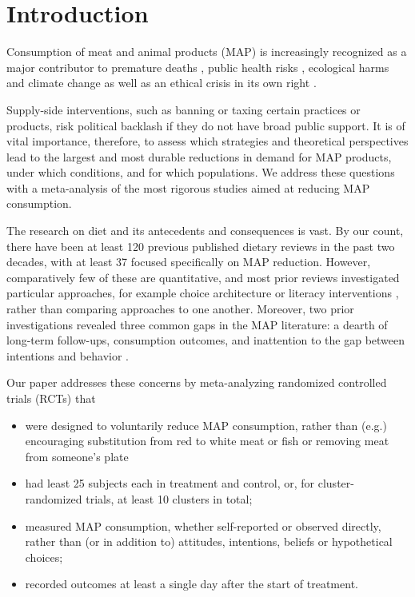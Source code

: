 \documentclass[sn-nature,pdflatex]{sn-jnl}
\begin{document}



\maketitle

\section{Introduction}\label{sec1}

Consumption of meat and animal products (MAP) is increasingly recognized
as a major contributor to premature deaths
\citep{willett2019, landry2023}, public health risks
\citep{slingenbergh2004, graham2008}, ecological harms
\citep{greger2010} and climate change
\citep{scarborough2023, koneswaran2008} as well as an ethical crisis in
its own right \citep{kuruc2023, singer2023}.

Supply-side interventions, such as banning or taxing certain practices
or products, risk political backlash if they do not have broad public
support. It is of vital importance, therefore, to assess which
strategies and theoretical perspectives lead to the largest and most
durable reductions in demand for MAP products, under which conditions,
and for which populations. We address these questions with a
meta-analysis of the most rigorous studies aimed at reducing MAP
consumption.

The research on diet and its antecedents and consequences is vast. By
our count, there have been at least 120 previous published dietary
reviews in the past two decades, with at least 37 focused specifically
on MAP reduction. However, comparatively few of these are quantitative,
and most prior reviews investigated particular approaches, for example
choice architecture \citep{bianchi2018restructuring} or literacy
interventions \citep{DiGennaro2024}, rather than comparing approaches to
one another. Moreover, two prior investigations revealed three common
gaps in the MAP literature: a dearth of long-term follow-ups,
consumption outcomes, and inattention to the gap between intentions and
behavior \citep{mathur2021meta, mathur2021effectiveness}.

Our paper addresses these concerns by meta-analyzing randomized
controlled trials (RCTs) that

\begin{itemize}
\item
  were designed to voluntarily reduce MAP consumption, rather than
  (e.g.) encouraging substitution from red to white meat or fish or
  removing meat from someone's plate
\item
  had least 25 subjects each in treatment and control, or, for
  cluster-randomized trials, at least 10 clusters in total;
\item
  measured MAP consumption, whether self-reported or observed directly,
  rather than (or in addition to) attitudes, intentions, beliefs or
  hypothetical choices;
\item
  recorded outcomes at least a single day after the start of treatment.
\end{itemize}
\end{document}
